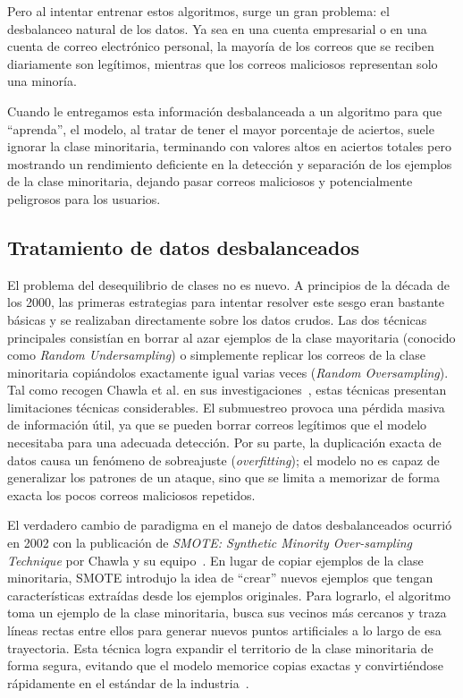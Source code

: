 \documentclass[a4paper,11pt ,openany]{book}
\begin{document}
Pero al intentar entrenar estos algoritmos, surge un gran problema: el desbalanceo natural de los datos. Ya sea en una cuenta empresarial o en una cuenta de correo electrónico personal, la  mayoría de los correos que se reciben diariamente son legítimos, mientras que los correos  maliciosos representan solo una minoría. 

Cuando le entregamos esta información desbalanceada a un algoritmo  para que ``aprenda'', el modelo, al tratar de tener el mayor porcentaje de aciertos, suele ignorar la clase minoritaria, terminando con valores altos en aciertos totales pero mostrando un rendimiento deficiente en la detección y separación de los ejemplos de la clase minoritaria, dejando pasar correos maliciosos y potencialmente peligrosos para los usuarios.


\subsection{Tratamiento de datos desbalanceados}
El problema del desequilibrio de clases no es nuevo. A principios de la década de los 2000, las primeras estrategias para intentar resolver este sesgo eran bastante básicas y se realizaban directamente sobre los datos crudos. Las dos técnicas principales consistían en borrar al azar ejemplos de la clase mayoritaria (conocido como \textit{Random Undersampling}) o simplemente replicar los correos de la clase minoritaria copiándolos exactamente igual varias veces (\textit{Random Oversampling}). 
Tal como recogen Chawla et al. en sus investigaciones~\cite{chawla2002smote}, estas técnicas presentan limitaciones técnicas considerables. El submuestreo provoca una pérdida masiva de información útil, ya que se pueden borrar correos legítimos que el modelo necesitaba para una adecuada detección. Por su parte, la duplicación exacta de datos causa un fenómeno de sobreajuste (\textit{overfitting}); el modelo no es capaz de generalizar los patrones de un ataque, sino que se limita a memorizar de forma exacta los pocos correos maliciosos repetidos.


El verdadero cambio de paradigma en el manejo de datos desbalanceados ocurrió en  2002 con la publicación de \textit{SMOTE: Synthetic Minority Over-sampling Technique} por Chawla y su equipo~\cite{chawla2002smote}. 
En lugar de copiar ejemplos de la clase minoritaria, SMOTE introdujo la idea de ``crear'' nuevos ejemplos  que tengan características extraídas desde los ejemplos originales. Para lograrlo, el algoritmo toma un ejemplo de la clase minoritaria, busca sus vecinos más cercanos y traza líneas rectas entre ellos para generar nuevos puntos artificiales a lo largo de esa trayectoria. Esta técnica logra expandir el territorio de la clase minoritaria de forma segura, evitando que el modelo memorice copias exactas y convirtiéndose rápidamente en el estándar de la industria~\cite{fernandez2018smote}.
\end{document}
